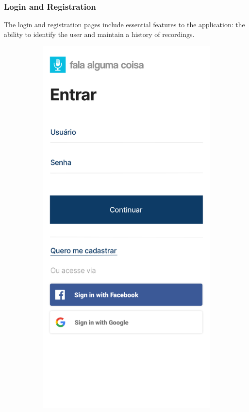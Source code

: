 \subsubsection{Login and Registration}

The login and registration pages include essential features to the application: the ability to identify the user and maintain a history of recordings.

\begin{figure}[ht]
    \centering
    \caption{Fale Alguma Coisa Login and Registration Page designs}
    \begin{subfigure}{.5\textwidth}
      \centering
      \includegraphics[width=.9\linewidth]{images/app/login/Login1.png}

\end{subfigure}
\end{figure}
